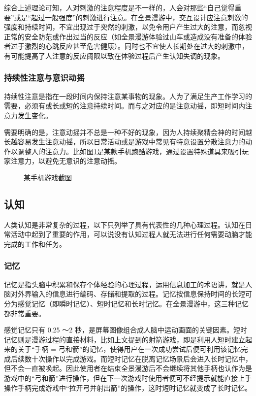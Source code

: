 综合上述理论可知，人对刺激的注意程度是不一样的，人会对那些“自己觉得重要”或是“超过一般强度”的刺激进行注意。在全景漫游中，交互设计应注意刺激的强度和持续时间，不宜出现过于突然的刺激，以免令用户产生过大的注意，而忽视正常的安全防范或作出过当的反应（如全景漫游体验过山车或造成没有准备的体验者过于激烈的心跳反应甚至危害健康）。同时也不宜使人长期处在过大的刺激中，有可能提高了人注意的反应阈限以致在体验过程后产生认知失调的现象。

\subsubsection{持续性注意与意识动摇}
持续性注意是指在一段时间内保持注意某事物的现象。人为了满足生产工作学习的需要，必须有或长或短的注意持续时间。而与之对应的是注意动摇，即短时间内注意力发生变化。

需要明确的是，注意动摇并不总是一种不好的现象，因为人持续聚精会神的时间越长越容易发生注意动摇，所以日常活动或是游戏中常见有特意设置分散注意力的动作以调整人的注意力。比如图\ref{fig:magnet}是某款手机跑酷游戏，通过设置特殊道具来吸引玩家注意力，以避免无意识的注意动摇。

\begin{figure}[htp]
\centering
{}
\caption{某手机游戏截图}
\label{fig:magnet}
\end{figure}

\subsection{认知}
人类认知是非常复杂的过程，以下只列举了具有代表性的几种心理过程。认知在日常活动中起到了重要的作用，可以说没有认知过程人就无法进行任何需要动脑才能完成的工作和任务。

\subsubsection{记忆}
记忆是指头脑中积累和保存个体经验的心理过程，运用信息加工的术语讲，就是人脑对外界输入的信息进行编码、存储和提取的过程。记忆按信息保持时间的长短可分为感觉记忆（即瞬时记忆）、短时记忆和长时记忆。在全景漫游中，这三种记忆都非常重要。

感觉记忆只有 0.25
～2 秒，是屏幕图像组合成人脑中运动画面的关键因素。短时记忆则是漫游过程的直接材料，比如上文提到的射箭游戏，即是利用人短时建立起来的关于“手柄 = 弓和箭”的记忆，使得用户在一次成功尝试后便可利用该记忆完成后续数十次操作以完成游戏。而短时记忆在脱离记忆场景后会进入长时记忆中，但不会一直被唤起。因此使用者在结束全景漫游后不会继续将其他手柄也认作为是游戏中的“弓和箭”进行操作，但在下一次游戏时使用者便可不经提示就能直接上手操作手柄完成游戏中“拉开弓并射出箭”的操作，这时短时记忆就变成了长时记忆。

